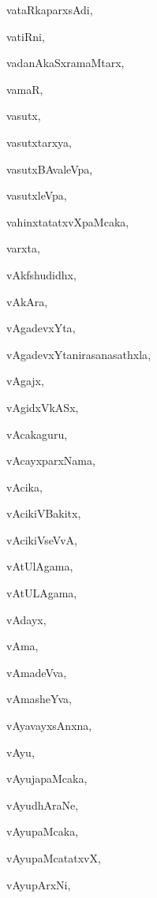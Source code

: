 \begin{multicols}{2}
{vataRkaparxsAdi}, \pageref{vataRkaparxsAdi}

{vatiRni}, \pageref{vatiRni}

{vadanAkaSxramaMtarx}, \pageref{vadanAkaSxramaMtarx}

{vamaR}, \pageref{vamaR}

{vasutx}, \pageref{vasutx}

{vasutxtarxya}, \pageref{vasutxtarxya}

{vasutxBAvaleVpa}, \pageref{vasutxBAvaleVpa}

{vasutxleVpa}, \pageref{vasutxleVpa}

{vahinxtatatxvXpaMcaka}, \pageref{vahinxtatatxvXpaMcaka}

{varxta}, \pageref{varxta}

{vAkfshudidhx}, \pageref{vAkfshudidhx}

{vAkAra}, \pageref{vAkAra}

{vAgadevxYta}, \pageref{vAgadevxYta}

{vAgadevxYtanirasanasathxla}, \pageref{vAgadevxYtanirasanasathxla}

{vAgajx}, \pageref{vAgajx}

{vAgidxVkASx}, \pageref{vAgidxVkASx}

{vAcakaguru}, \pageref{vAcakaguru}

{vAcayxparxNama}, \pageref{vAcayxparxNama}

{vAcika}, \pageref{vAcika}

{vAcikiVBakitx}, \pageref{vAcikiVBakitx}

{vAcikiVseVvA}, \pageref{vAcikiVseVvA}

{vAtUlAgama}, \pageref{vAtUlAgama}

{vAtULAgama}, \pageref{vAtULAgama}

{vAdayx}, \pageref{vAdayx}

{vAma}, \pageref{vAma}

{vAmadeVva}, \pageref{vAmadeVva}

{vAmasheYva}, \pageref{vAmasheYva}

{vAyavayxsAnxna}, \pageref{vAyavayxsAnxna}

{vAyu}, \pageref{vAyu}

{vAyujapaMcaka}, \pageref{vAyujapaMcaka}

{vAyudhAraNe}, \pageref{vAyudhAraNe}

{vAyupaMcaka}, \pageref{vAyupaMcaka}

{vAyupaMcatatxvX}, \pageref{vAyupaMcatatxvX}

{vAyupArxNi}, \pageref{vAyupArxNi}


\end{multicols}
